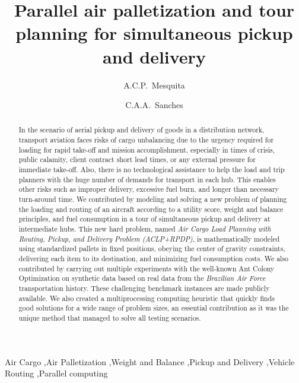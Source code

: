 \documentclass[preprint,authoryear]{elsarticle}
\begin{document}
\begin{frontmatter}

\title{Parallel air palletization and tour planning for simultaneous pickup and delivery}

\author{A.C.P.~Mesquita}

\author{C.A.A.~Sanches}

\address {Instituto Tecnol\'{o}gico de Aeron\'{a}utica - DCTA/ITA/IEC\\
Pra\c{c}a Mal. Eduardo Gomes, 50\\
S\~{a}o Jos\'{e} dos Campos - SP - 12.228-900 - Brazil}


\begin{abstract}

In the scenario of aerial pickup and delivery of goods in a distribution network, transport aviation faces risks of cargo unbalancing due to the urgency required for loading for rapid take-off and mission accomplishment, especially in times of crisis, public calamity, client contract short lead times, or any external pressure for immediate take-off. Also, there is no technological assistance to help the load and trip planners with the huge number of demands for transport in each hub.
This enables other risks such as improper delivery, excessive fuel burn, and longer than necessary turn-around time. We contributed by modeling and solving a new problem of planning the loading and routing of an aircraft according to a utility score, weight and balance principles, and fuel consumption in a tour of simultaneous pickup and delivery at intermediate hubs.
This new hard problem, named {\it Air Cargo Load Planning with Routing, Pickup, and Delivery Problem (ACLP+RPDP)}, is mathematically modeled using standardized pallets in fixed positions, obeying the center of gravity constraints, delivering each item to its destination, and minimizing fuel consumption costs.
We also contributed by carrying out multiple experiments with the well-known Ant Colony Optimization on synthetic data based on real data from the {\it Brazilian Air Force}\/ transportation history.
These challenging benchmark instances are made publicly available. We also created a multiprocessing computing heuristic that quickly finds good solutions for a wide range of problem sizes, an essential contribution as it was the unique method that managed to solve all testing scenarios.


\end{abstract}

\begin{keyword}
Air Cargo \sep Air Palletization \sep Weight and Balance \sep Pickup and Delivery \sep Vehicle Routing \sep Parallel computing
\end{keyword}

\end{frontmatter}
\end{document}

